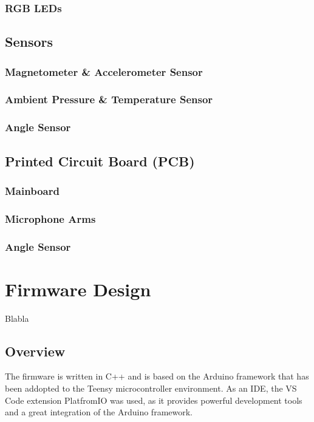 \subsubsection{RGB LEDs}

\subsection{Sensors}

\subsubsection{Magnetometer \& Accelerometer Sensor}

\subsubsection{Ambient Pressure \& Temperature Sensor}

\subsubsection{Angle Sensor}

\subsection{Printed Circuit Board (PCB)}

\subsubsection{Mainboard}

\subsubsection{Microphone Arms}

\subsubsection{Angle Sensor}

\newpage
\section{Firmware Design}
Blabla

\subsection{Overview}
The firmware is written in C++ and is based on the Arduino framework that has been addopted to the Teensy microcontroller environment.
As an IDE, the VS Code extension PlatfromIO was used, as it provides powerful development tools and a great integration of the Arduino framework.



